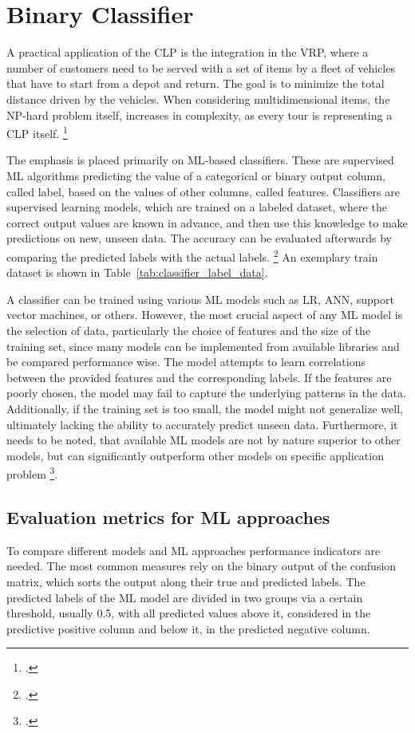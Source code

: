 \chapter{Binary Classifier}
\label{chap:classifier}

A practical application of the \gls{CLP} is the integration in the \gls{VRP}, where
a number of customers need to be served with a set of items by a fleet of vehicles that have
to start from a depot and return. The goal is to minimize the total distance driven
by the vehicles. When considering multidimensional items, the NP-hard problem itself,
increases in complexity, as every tour is representing a \gls{CLP} itself. \footcite[cf.][pp. 1--2]{tamke_branch-and-cut_2024}

The emphasis is placed primarily on \gls{ML}-based classifiers.
These are supervised \gls{ML} algorithms predicting the
value of a categorical or binary output column, called label, based on the
values of other columns, called features. Classifiers are supervised learning models,
which are trained on a labeled dataset,
where the correct output values are known in advance, and then use this knowledge to
make predictions on new, unseen data. The accuracy can be evaluated afterwards by comparing
the predicted labels with the actual labels. \footcite[cf.][]{kotsiantis_supervised_2007}
An exemplary train dataset is shown in Table~\ref{tab:classifier_label_data}.



A classifier can be trained using various \gls{ML} models such as \gls{LR},
\gls{ANN}, support vector machines, or others. However, the most crucial aspect of any
\gls{ML} model is the selection of data, particularly the choice of features and
the size of the training set, since many models can be implemented from available
libraries and be compared performance wise. The model attempts to learn correlations between the provided features
and the corresponding labels. If the features are poorly chosen, the model may fail
to capture the underlying patterns in the data. Additionally, if the training set
is too small, the model might not generalize well, ultimately lacking the ability
to accurately predict unseen data. Furthermore, it needs to be noted, that available
\gls{ML} models are not by nature superior to other models, but can significantly outperform
other models on specific application problem \footcite[cf.][pp. 250, 264]{kotsiantis_supervised_2007}.


\section{Evaluation metrics for ML approaches}
\label{sec:classifier_objectives}
To compare different models and \gls{ML} approaches performance indicators are needed. The most common
measures rely on the binary output of the confusion matrix, which sorts the output along
their true and predicted labels. The predicted labels of the \gls{ML} model are
divided in two groups via a certain threshold, usually 0.5, with all predicted values above it,
considered in the predictive positive column and below it, in the predicted negative column.

